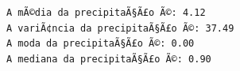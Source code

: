 ﻿\documentclass[11pt]{article}
\makeatletter
\newcommand{\boxspacing}{\kern\kvtcb@left@rule\kern\kvtcb@boxsep}
\newcommand{\prompt}[4]{
        {\ttfamily\llap{{\color{#2}[#3]:\hspace{3pt}#4}}\vspace{-\baselineskip}}
    }
\makeatother
\begin{document}
    \begin{Verbatim}[commandchars=\\\{\}]
A mÃ©dia da precipitaÃ§Ã£o Ã©: 4.12
A variÃ¢ncia da precipitaÃ§Ã£o Ã©: 37.49
A moda da precipitaÃ§Ã£o Ã©: 0.00
A mediana da precipitaÃ§Ã£o Ã©: 0.90
    \end{Verbatim}

    \begin{tcolorbox}[breakable, size=fbox, boxrule=1pt, pad at break*=1mm,colback=cellbackground, colframe=cellborder]
\prompt{In}{incolor}{ }{\boxspacing}
\begin{Verbatim}[commandchars=\\\{\}]

\end{Verbatim}
\end{tcolorbox}


    
    
    
\end{document}

